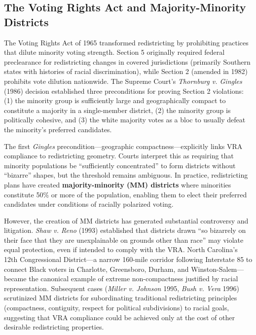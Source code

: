 \subsection{The Voting Rights Act and Majority-Minority Districts}

The Voting Rights Act of 1965 transformed redistricting by prohibiting practices that dilute minority voting strength. Section 5 originally required federal preclearance for redistricting changes in covered jurisdictions (primarily Southern states with histories of racial discrimination), while Section 2 (amended in 1982) prohibits vote dilution nationwide. The Supreme Court's \emph{Thornburg v. Gingles} (1986) decision established three preconditions for proving Section 2 violations: (1) the minority group is sufficiently large and geographically compact to constitute a majority in a single-member district, (2) the minority group is politically cohesive, and (3) the white majority votes as a bloc to usually defeat the minority's preferred candidates.

The first \emph{Gingles} precondition---geographic compactness---explicitly links VRA compliance to redistricting geometry. Courts interpret this as requiring that minority populations be ``sufficiently concentrated'' to form districts without ``bizarre'' shapes, but the threshold remains ambiguous. In practice, redistricting plans have created \textbf{majority-minority (MM) districts} where minorities constitute 50\% or more of the population, enabling them to elect their preferred candidates under conditions of racially polarized voting.

However, the creation of MM districts has generated substantial controversy and litigation. \emph{Shaw v. Reno} (1993) established that districts drawn ``so bizarrely on their face that they are unexplainable on grounds other than race'' may violate equal protection, even if intended to comply with the VRA. North Carolina's 12th Congressional District---a narrow 160-mile corridor following Interstate 85 to connect Black voters in Charlotte, Greensboro, Durham, and Winston-Salem---became the canonical example of extreme non-compactness justified by racial representation. Subsequent cases (\emph{Miller v. Johnson} 1995, \emph{Bush v. Vera} 1996) scrutinized MM districts for subordinating traditional redistricting principles (compactness, contiguity, respect for political subdivisions) to racial goals, suggesting that VRA compliance could be achieved only at the cost of other desirable redistricting properties.

